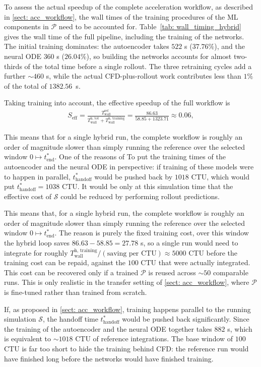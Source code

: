 To assess the actual speedup of the complete acceleration workflow, as described in \ref{sect: acc_workflow}, the wall times of the training procedures of the ML components in $\mathcal{P}$ need to be accounted for. Table~\ref{tab: wall_timing_hybrid} gives the wall time of the full pipeline, including the training of the networks. The initial training dominates: the autoencoder takes $522$ s ($37.76\%$), and the neural ODE $360$ s ($26.04\%$), so building the networks accounts for almost two-thirds of the total time before a single rollout. The three retraining cycles add a further ${\sim}460$ s, while the actual CFD-plus-rollout work contributes less than $1\%$ of the total of $1382.56$~s.


Taking training into account, the effective speedup of the full workflow is
\begin{align}
    S_\text{eff}
    = \frac{T_\text{wall}^\text{ref}}{T_\text{wall}^\text{h, tot} + T_\text{wall}^\text{h, training}}
    = \frac{86.63}{58.85 + 1323.71}
    \approx 0.06,
\end{align}

This means that for a single hybrid run, the complete workflow is roughly an order of magnitude slower than simply running the reference over the selected window $0 \mapsto t^*_\text{end}$. One of the reasons of To put the training times of the autoencoder and the neural ODE in perspective: if training of these models were to happen in parallel, $t^*_\text{handoff}$ would be pushed back by $1018$ CTU, which would put $t^*_\text{handoff}=1038$ CTU. It would be only at this simulation time that the effective cost of $\mathcal{S}$ could be reduced by performing rollout predictions.  

This means that, for a single hybrid run, the complete workflow is roughly an order of magnitude slower than simply running the reference over the selected window $0 \mapsto t^*_\text{end}$. The reason is purely the fixed training cost, over this window the hybrid loop saves $86.63 - 58.85 = 27.78$ s, so a single run would need to integrate for roughly $T_\text{wall}^\text{h, training} / (\text{saving per CTU}) \approx 5000$ CTU before the training cost can be repaid, against the $100$ CTU that were actually integrated. This cost can be recovered only if a trained $\mathcal{P}$ is reused across ${\sim}50$ comparable runs. This is only realistic in the transfer setting of \ref{sect: acc_workflow}, where $\mathcal{P}$ is fine-tuned rather than trained from scratch.

If, as proposed in \ref{sect: acc_workflow}, training happens parallel to the running simulation $\mathcal{S}$, the handoff time $t^*_\text{handoff}$ would be pushed back significantly. Since the training of the autoencoder and the neural ODE together takes $882$ s, which is equivalent to ${\sim}1018$ CTU of reference integrations. The base window of $100$ CTU is far too short to hide the training behind CFD: the reference run would have finished long before the networks would have finished training.

